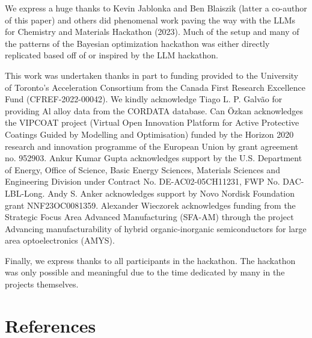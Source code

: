\documentclass[superscriptaddress, nofootinbib,  amsmath, amssymb, twocolumn]{revtex4-2} %
\begin{document}
We express a huge thanks to Kevin Jablonka and Ben Blaiszik (latter a co-author of this paper) and others did phenomenal work paving the way with the LLMs for Chemistry and Materials Hackathon (2023). Much of the setup and many of the patterns of the Bayesian optimization hackathon was either directly replicated based off of or inspired by the LLM hackathon.

This work was undertaken thanks in part to funding provided to the University of Toronto’s Acceleration Consortium from the Canada First Research Excellence Fund (CFREF-2022-00042). We kindly acknowledge Tiago L. P. Galvão for providing Al alloy data from the CORDATA database. Can Özkan acknowledges the VIPCOAT project (Virtual Open Innovation Platform for Active Protective Coatings Guided by Modelling and Optimisation) funded by the Horizon 2020 research and innovation programme of the European Union by grant agreement no. 952903. Ankur Kumar Gupta acknowledges support by the U.S. Department of Energy, Office of Science, Basic Energy Sciences, Materials Sciences and Engineering Division under Contract No. DE-AC02-05CH11231, FWP No. DAC-LBL-Long.
Andy S. Anker acknowledges support by Novo Nordisk Foundation grant NNF23OC0081359. Alexander Wieczorek acknowledges funding from the Strategic Focus Area Advanced Manufacturing (SFA-AM) through the project Advancing manufacturability of hybrid organic-inorganic semiconductors for large area optoelectronics (AMYS).

Finally, we express thanks to all participants in the hackathon. The hackathon was only possible and meaningful due to the time dedicated by many in the projects themselves.

\section*{References}


% 

\end{document}
